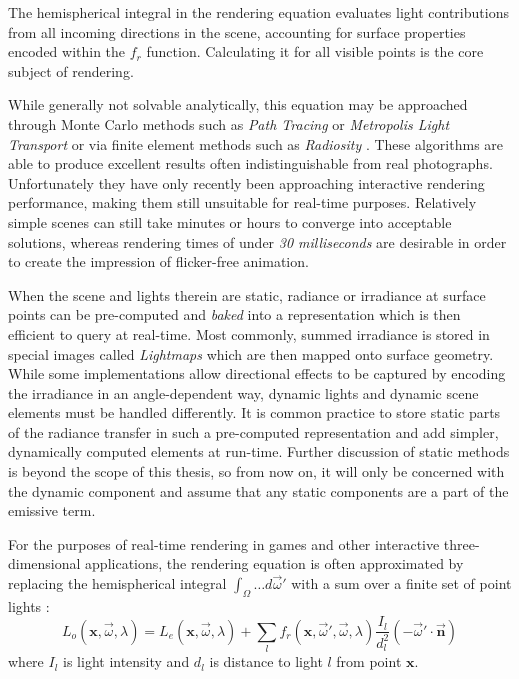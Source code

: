 The hemispherical integral in the rendering equation evaluates light contributions from all incoming directions in the scene, accounting for surface properties encoded within the $f_r$ function. Calculating it for all visible points is the core subject of rendering.

While generally not solvable analytically, this equation may be approached through Monte Carlo methods such as \emph{Path Tracing} \cite{Kajiya86RenderingEq} or \emph{Metropolis Light Transport} \cite{MLT} or via finite element methods such as \emph{Radiosity} \cite{Radiosity}. These algorithms are able to produce excellent results often indistinguishable from real photographs. Unfortunately they have only recently been approaching interactive rendering performance, making them still unsuitable for real-time purposes. Relatively simple scenes can still take minutes or hours to converge into acceptable solutions, whereas rendering times of under \emph{30 milliseconds} are desirable in order to create the impression of flicker-free animation.

When the scene and lights therein are static, radiance or irradiance at surface points can be pre-computed and \emph{baked} into a representation which is then efficient to query at real-time. Most commonly, summed irradiance is stored in special images called \emph{Lightmaps} \cite{lightmaps} which are then mapped onto surface geometry. While some implementations \cite{Chen08Halo3} allow directional effects to be captured by encoding the irradiance in an angle-dependent way, dynamic lights and dynamic scene elements must be handled differently. It is common practice to store static parts of the radiance transfer in such a pre-computed representation and add simpler, dynamically computed elements at run-time. Further discussion of static methods is beyond the scope of this thesis, so from now on, it will only be concerned with the dynamic component and assume that any static components are a part of the emissive term.

For the purposes of real-time rendering in games and other interactive three-dimensional applications, the rendering equation is often approximated by replacing the hemispherical integral $\int_\Omega \ldots d \overrightarrow{\omega}'$ with a sum over a finite set of point lights \cite{Naty06Reflectance}:
\[
L_o(\mathbf x, \overrightarrow{\omega}, \lambda) = L_e(\mathbf x, \overrightarrow{\omega}, \lambda) + \sum_l f_r(\mathbf x, \overrightarrow{\omega}', \overrightarrow{\omega}, \lambda) \frac{I_l}{d_l^2} (-\overrightarrow{\omega}' \cdot \overrightarrow{\mathbf n})
\]
where $I_l$ is light intensity and $d_l$ is distance to light $l$ from point $\mathbf x$.

